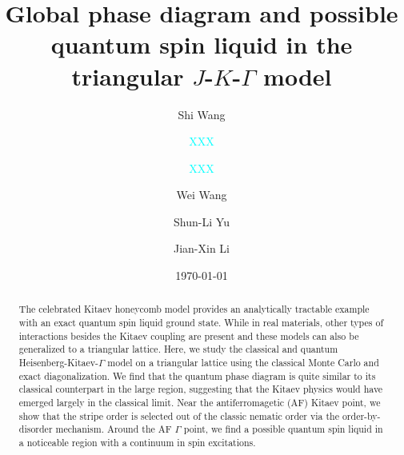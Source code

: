 \documentclass[aps,prb,reprint,amsfonts,amsmath,amssymb,showpacs,groupedaddress,superscriptaddress]{revtex4-1}
\begin{document}
\title{Global phase diagram and possible quantum spin liquid in the triangular $J$-$K$-$\Gamma$ model}

\author{Shi Wang}

\author{\textcolor{cyan}{XXX}}
\affiliation{\textcolor{cyan}{XXX}}

\author{\textcolor{cyan}{XXX}}
\affiliation{\textcolor{cyan}{XXX}}

\author{Wei Wang}

\author{Shun-Li Yu}

\author{Jian-Xin Li}

\date{\today}

\begin{abstract}
The celebrated Kitaev honeycomb model provides an analytically tractable example with an exact quantum spin liquid ground state. While in real materials, other types of interactions besides the Kitaev coupling are present and these models can also be generalized to a triangular lattice. Here, we study the classical and quantum Heisenberg-Kitaev-$\Gamma$ model on a triangular lattice using the classical Monte Carlo and exact diagonalization. We find that the quantum phase diagram is quite similar to its classical counterpart in the large region, suggesting that the Kitaev physics would have emerged largely in the classical limit. Near the antiferromagetic (AF) Kitaev point, we show that the stripe order is selected out of the classic nematic order via the order-by-disorder mechanism. Around the AF $\Gamma$ point, we find a possible quantum spin liquid in a noticeable region with a continuum in spin excitations.
\end{abstract}

\maketitle
\end{document}
